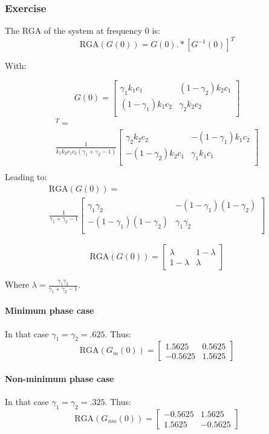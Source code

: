\subsubsection{Exercise} 

The RGA of the system at frequency 0 is:
$$
\text{RGA}(G(0)) = G(0).\ast[G^{-1}(0)]^T 
$$

With:

\begin{equation*}
    G(0) =
\left[
    \begin{array}{cc}
        \gamma_1k_1c_1 & (1-\gamma_2)k_2c_1 \\
        (1-\gamma_1)k_1c_2 & \gamma_2k_2c_2 \\
    \end{array}
\right]
\end{equation*}
\begin{multline*}
[G^{-1}(0)]^T = \\
\frac{1}{k_1k_2c_1c_2(\gamma_1+\gamma_2-1)}
\left[
    \begin{array}{cc}
        \gamma_2k_2c_2 & -(1-\gamma_1)k_1c_2 \\
        -(1-\gamma_2)k_2c_1 & \gamma_1k_1c_1 \\
    \end{array}
\right]\\
\end{multline*}
Leading to:
\begin{multline*}
    \text{RGA}(G(0)) =\\ 
\frac{1}{\gamma_1+\gamma_2-1}
\left[
    \begin{array}{cc}
        \gamma_1\gamma_2 & -(1-\gamma_1)(1-\gamma_2) \\
        -(1-\gamma_1)(1-\gamma_2) & \gamma_1\gamma_2 \\
    \end{array}
\right]
\end{multline*}

\begin{equation}
    \boxed{
    \text{RGA}(G(0)) =
    \left[
        \begin{array}{cc}
            \lambda & 1 - \lambda \\
            1 - \lambda & \lambda
        \end{array}
    \right]
}
\end{equation}

Where $\lambda = \frac{\gamma_1\gamma_2}{\gamma_1+\gamma_2-1}$.

\paragraph{Minimum phase case}
In that case $\gamma_1 = \gamma_2 = .625$. Thus:
$$
\text{RGA}(G_{m}(0)) =
    \left[
        \begin{array}{cc}
            1.5625 & 0.5625 \\
            -0.5625 & 1.5625
        \end{array}
    \right]
$$

\paragraph{Non-minimum phase case}
In that case $\gamma_1 = \gamma_2 = .325$. Thus:
$$
\text{RGA}(G_{nm}(0)) =
    \left[
        \begin{array}{cc}
            -0.5625 & 1.5625 \\
            1.5625 & -0.5625
        \end{array}
    \right]
$$
